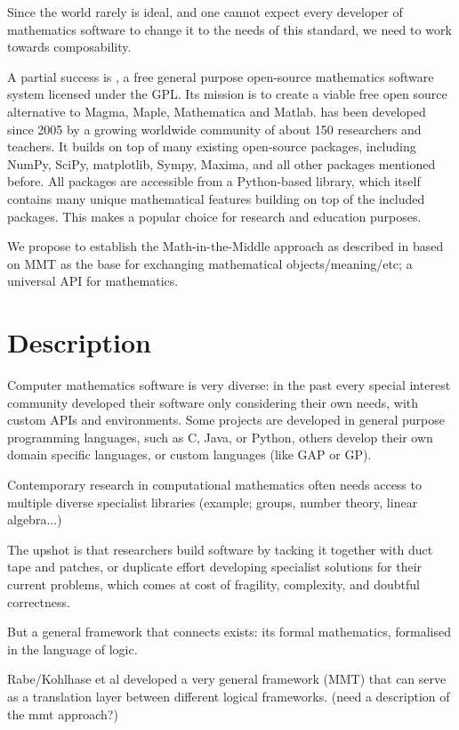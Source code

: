 Since the world rarely is ideal, and one cannot expect every developer of
mathematics software to change it to the needs of this standard, we need to work
towards composability.

A partial success is \Sage, a free general purpose open-source mathematics
software system licensed under the GPL. Its mission is to create a
viable free open source alternative to Magma, Maple, Mathematica and
Matlab.
\Sage has been developed since 2005 by a growing worldwide community of
about 150 researchers and teachers. It builds on top of many existing
open-source packages, including NumPy, SciPy, matplotlib, Sympy,
Maxima, and all other packages mentioned before.
All packages are accessible from a Python-based library, which itself
contains many unique mathematical features building on top of the included packages.
This makes \Sage a popular choice for research and education purposes.

We propose to establish the Math-in-the-Middle approach as described in
 based on MMT as the base for exchanging mathematical
objects/meaning/etc; a universal API for mathematics.


\section{Description}

Computer mathematics software is very diverse: in the past every special
interest community developed their software only considering their own
needs, with custom APIs and environments. Some projects are developed in general
purpose programming languages, such as C, Java, or Python, others develop their
own domain specific languages, or custom languages (like GAP or GP).

Contemporary research in computational mathematics often needs access to
multiple diverse specialist libraries (example; groups, number theory, linear algebra...) 

The upshot is that researchers build software by tacking it together with duct
tape and patches, or duplicate effort developing specialist solutions for their
current problems, which comes at cost of fragility, complexity, and doubtful correctness.

But a general framework that connects exists: its formal mathematics, formalised
in the language of logic.

Rabe/Kohlhase et al developed a very general framework (MMT) that can serve as a
translation layer between different logical frameworks.
(need a description of the mmt approach?)

